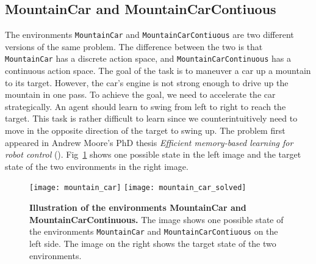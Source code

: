 \subsection{MountainCar and MountainCarContiuous}
The environments \verb|MountainCar| and \verb|MountainCarContiuous| are two different versions of the same problem. The difference between the two is that \verb|MountainCar| has a discrete action space, and \verb|MountainCarContinuous| has a continuous action space. The goal of the task is to maneuver a car up a mountain to its target. However, the car's engine is not strong enough to drive up the mountain in one pass. To achieve the goal, we need to accelerate the car strategically. An agent should learn to swing from left to right to reach the target. This task is rather difficult to learn since we counterintuitively need to move in the opposite direction of the target to swing up. The problem first appeared in Andrew Moore's PhD thesis \emph{Efficient memory-based learning for robot control} (\cite{moore1990efficient}). Fig~\ref{fig:mountain_car} shows one possible state in the left image and the target state of the two environments in the right image.
\begin{figure}[!ht]
  \centering
  \texttt{[image: mountain\_car]} \hspace*{10mm} \texttt{[image: mountain\_car\_solved]}
\caption[Illustration of the environment MountainCar]{
  \textbf{Illustration of the environments MountainCar and MountainCarContinuous.}
  The image shows one possible state of the environments \texttt{MountainCar} and \texttt{MountainCarContiuous} on the left side. The image on the right shows the target state of the two environments.
}
\label{fig:mountain_car}
\end{figure}

